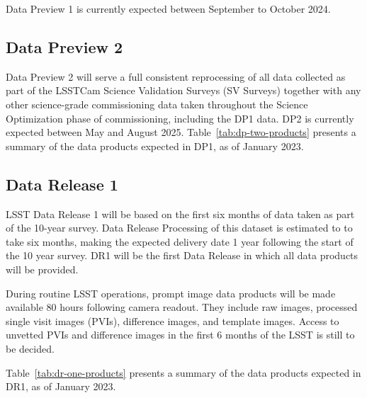 Data Preview 1 is currently expected between September to October 2024. 

\subsection{Data Preview 2}

Data Preview 2 will serve a full consistent reprocessing of all data collected as part of the LSSTCam Science Validation Surveys (SV Surveys) together with any other science-grade commissioning data taken throughout the Science Optimization phase of commissioning, including the DP1 data. 
DP2 is currently expected between May and August 2025. 
Table~\ref{tab:dp-two-products} presents a summary of the data products expected in DP1, as of January 2023.

\subsection{Data Release 1}

LSST Data Release 1 will be based on the first six months of data taken as part of the 10-year survey. 
Data Release Processing of this dataset is estimated to to take six months, making the expected delivery date 1 year following the start of the 10 year survey. 
DR1 will be the first Data Release in which all data products will be provided. 

During routine LSST operations, prompt image data products will be made available 80 hours following camera readout.
They include raw images, processed single visit images (PVIs), difference images, and template images.
Access to unvetted PVIs and difference images in the first 6 months of the LSST is still to be decided.

Table~\ref{tab:dr-one-products} presents a summary of the data products expected in DR1, as of January 2023.


